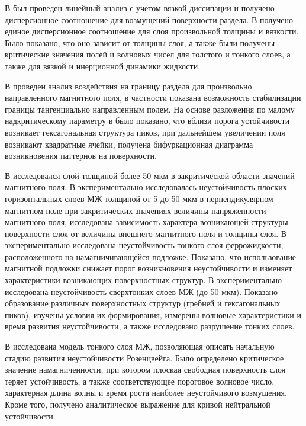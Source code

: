 \documentclass[12pt,a4paper]{article}
\begin{document}
В \cite{Salin1993} был проведен линейный анализ с учетом вязкой диссипации и получено дисперсионное соотношение для возмущений поверхности раздела. В \cite{Abou1997} получено единое дисперсионное соотношение для слоя произвольной толщины и вязкости. Было показано, что оно зависит от толщины слоя, а также были получены критические значения полей и волновых чисел для толстого и тонкого слоев, а также для вязкой и инерционной динамики жидкости. 

В \cite{Zelazo1969} проведен анализ воздействия на границу раздела для произвольно направленного магнитного поля, в частности показана возможность стабилизации границы тангенциально направленным полем. На основе разложения по малому надкритическому параметру в \cite{Gailtis1977} было показано, что вблизи порога устойчивости возникает гексагональная структура пиков, при дальнейшем увеличении поля возникают квадратные ячейки, получена бифуркационная диаграмма возникновения паттернов на поверхности.  

В \cite{Bashtovoi1985} исследовался слой толщиной более 50 мкм в закритической области значений магнитного поля. В \cite{Dikanskii2010} экспериментально исследовалась неустойчивость плоских горизонтальных слоев МЖ толщиной от 5 до 50 мкм в перпендикулярном магнитном поле при закритических значениях величины напряженности магнитного поля, исследована зависимость характера возникающей структуры поверхности слоя от величины внешнего магнитного поля и толщины слоя. В \cite{Zakinyan2013} экспериментально исследована неустойчивость тонкого слоя феррожидкости, расположенного на намагничивающейся подложке. Показано, что использование магнитной подложки снижает порог возникновения неустойчивости и изменяет характеристики возникающих поверхностных структур. В \cite{Zakinyan2017} экспериментально исследована неустойчивость сверхтонких слоев МЖ (до 50 мкм). Показано образование различных поверхностных структур (гребней и гексагональных пиков), изучены условия их формирования, измерены волновые характеристики и время развития неустойчивости, а также исследовано разрушение тонких слоев.
 
 В \cite{Korovin2013} исследована модель тонкого слоя МЖ, позволяющая описать начальную стадию развития неустойчивости Розенцвейга. Было определено критическое значение намагниченности, при котором плоская свободная поверхность слоя теряет устойчивость, а также соответствующее пороговое волновое число, характерная длина волны и время роста наиболее неустойчивого возмущения. Кроме того, получено аналитическое выражение для кривой нейтральной устойчивости. 
 
\end{document}
